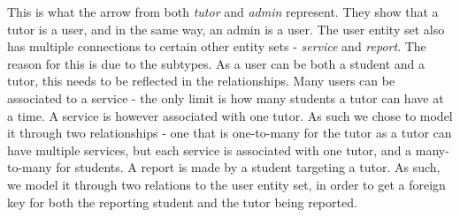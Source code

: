 This is what the arrow from both \textit{tutor} and \textit{admin} represent.
They show that a tutor is a user, and in the same way, an admin is a user.
The user entity set also has multiple connections to certain other entity sets - \textit{service} and \textit{report}.
The reason for this is due to the subtypes. 
As a user can be both a student and a tutor, this needs to be reflected in the relationships.
Many users can be associated to a service - the only limit is how many students a tutor can have at a time.
A service is however associated with one tutor.
As such we chose to model it through two relationships - one that is one-to-many for the tutor as a tutor can have multiple services, but each service is associated with one tutor, and a many-to-many for students.
A report is made by a student targeting a tutor. 
As such, we model it through two relations to the user entity set, in order to get a foreign key for both the reporting student and the tutor being reported.


